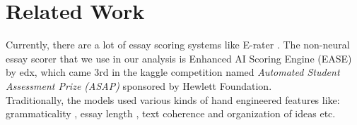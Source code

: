 \documentclass[11pt,a4paper]{article}
\begin{document}



\section{Related Work}

Currently, there are a lot of essay scoring systems like E-rater \cite{attali2004automated}. The non-neural essay scorer that we use in our analysis is Enhanced AI Scoring Engine (EASE) \cite{ease}
by edx, which came 3rd in the kaggle competition named \textit{Automated Student Assessment Prize (ASAP)} sponsored by Hewlett Foundation.\\
Traditionally, the models used various kinds of hand engineered features like: grammaticality \cite{attali2004automated}, essay length \cite{chen2013automated}, text coherence and organization of ideas\cite{chen2013automated} etc.\\
\end{document}

